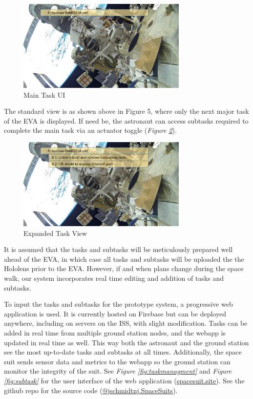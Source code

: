 \documentclass{article}
\begin{document}
\begin{figure}[!htb]
  \centering
  \includegraphics[width=0.75\textwidth]{assets/task4.png}
  \caption{Main Task UI}
  \label{fig:task4}
\end{figure}

The standard view is as shown above in Figure 5, where only the next major task of the EVA is displayed. If need be, the astronaut can access subtasks required to complete the main task via an actuator toggle (\textit{Figure \ref{fig:moresubtasks}}).

\begin{figure}[!htb]
  \centering
  \includegraphics[width=0.75\textwidth]{assets/moresubtasks.png}
  \caption{Expanded Task View}
  \label{fig:moresubtasks}
\end{figure}

It is assumed that the tasks and subtasks will be meticulously prepared well ahead of the EVA, in which case all tasks and subtasks will be uploaded the the Hololens prior to the EVA. However, if and when plans change during the space walk, our system incorporates real time editing and addition of tasks and subtasks.

To input the tasks and subtasks for the prototype system, a progressive web application is used. It is currently hosted on Firebase but can be deployed anywhere, including on servers on the ISS, with slight modification. Tasks can be added in real time from multiple ground station nodes, and the webapp is updated in real time as well. This way both the astronaut and the ground station see the most up-to-date tasks and subtasks at all times. Additionally, the space suit sends sensor data and metrics to the webapp so the ground station can monitor the integrity of the suit. See \textit{Figure \ref{fig:taskmanagment}} and \textit{Figure \ref{fig:subtask}} for the user interface of the web application (\href{https://spacesuit.site}{spacesuit.site}). See the github repo for the source code (\href{https://github.com/jschmidtnj/spacesuits}{@jschmidtnj.SpaceSuits}).
\end{document}
